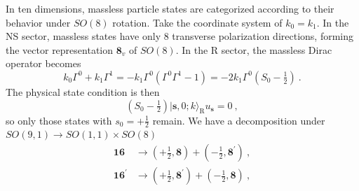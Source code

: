 	In ten dimensions, massless particle states are categorized according to their behavior under $SO(8)$ rotation. Take the coordinate system of $k_{0}=k_{1}$. In the NS sector, massless states have only 8 transverse polarization directions, forming the vector representation $\mathbf{8}_{v}$ of $SO(8)$. In the R sector, the massless Dirac operator becomes
	\begin{equation}
		k_{0}\Gamma^{0}+k_{1}\Gamma^{1} = -k_{1}\Gamma^{0}(\Gamma^{0}\Gamma^{1}-1)=-2k_{1}\Gamma^{0}(S_{0}-\tfrac{1}{2})\:.\label{10.5.15}
	\end{equation}
	The physical state condition is then
	\begin{equation}
		(S_{0}-\tfrac{1}{2})\lvert\mathbf{s},0;k\rangle_{\text{R}} u_{\mathbf{s}} =0 \:,\label{10.5.16}
	\end{equation}
	so only those states with $s_{0}=+\frac{1}{2}$ remain. We have a decomposition under $SO(9,1)\to SO(1,1)\times SO(8)$
	\begin{subequations}
		\begin{align}
			\mathbf{16} &\to (+\tfrac{1}{2},\mathbf{8}) + (-\tfrac{1}{2},\mathbf{8}^{\prime}) \:, \label{10.5.17a} \\
			\mathbf{16}^{\prime} &\to (+\tfrac{1}{2},\mathbf{8}^{\prime}) + (-\tfrac{1}{2},\mathbf{8})\:, \label{10.5.17b}
		\end{align}  \label{10.5.17}
	\end{subequations}
